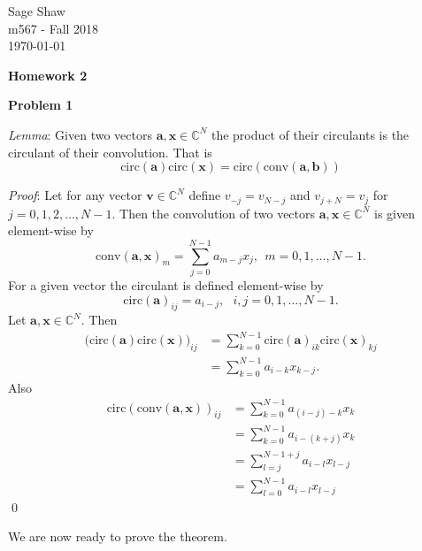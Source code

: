 \documentclass[12pt]{article}
\newcommand{\problem}[1]{\hspace{-4 ex} \large \textbf{Problem #1} }
\renewenvironment{proof}{\hspace{-4 ex} \emph{Proof}:}{\qed}
\newcommand{\CC}{\mathbb{C}}
\renewcommand{\vec}[1]{\boldsymbol{\mathbf{#1}}}
\begin{document}
	\thispagestyle{empty}
	
	\begin{flushright}
		Sage Shaw \\
		m567 - Fall 2018 \\
		\today
	\end{flushright}
	
\begin{center}{\large \textbf{Homework 2}}\end{center}
\bigbreak

\hspace{-.5 ex}\problem{1} 

\textit{Lemma}: Given two vectors $\vec{a}, \vec{x} \in \CC^N$ the product of their circulants is the circulant of their convolution. That is
$$
\text{circ}(\vec{a})\text{circ}(\vec{x}) = \text{circ}(\text{conv}(\vec{a}, \vec{b}))
$$

\begin{proof}
	Let for any vector $\vec{v} \in \CC^N$ define $v_{-j} = v_{N-j}$ and $v_{j+N} = v_j$ for $j=0, 1, 2, \dots, N-1$. Then the convolution of two vectors $\vec{a}, \vec{x} \in \CC^N$ is given element-wise by
	$$
	\text{conv}(\vec{a}, \vec{x})_m = \sum\limits_{j=0}^{N-1} a_{m-j}x_j, \ \ m=0,1,\dots, N-1 \text{.}
	$$
	For a given vector the circulant is defined element-wise by
	$$
	\text{circ}(\vec{a})_{ij} = a_{i-j}, \ \ \ i,j=0,1,\dots, N-1\text{.}
	$$
	Let $\vec{a},\vec{x} \in \CC^N$. Then
	\begin{align*}
		\big( \text{circ}(\vec{a}) \text{circ}(\vec{x}) \big)_{ij} &= \sum\limits_{k=0}^{N-1} \text{circ}(\vec{a})_{ik} \text{circ}(\vec{x})_{kj} \\
		&= \sum\limits_{k=0}^{N-1} a_{i-k} x_{k-j} \text{.}
	\end{align*}
	Also
	\begin{align*}
	\text{circ}(\text{conv}(\vec{a}, \vec{x}))_{ij} &= \sum\limits_{k=0}^{N-1} a_{(i-j)-k}x_k \\
	&= \sum\limits_{k=0}^{N-1} a_{i-(k+j)}x_k \\
	&= \sum\limits_{l=j}^{N-1+j} a_{i-l}x_{l-j} \\
	&= \sum\limits_{l=0}^{N-1} a_{i-l}x_{l-j}
	\end{align*}
\end{proof}

We are now ready to prove the theorem.\bigbreak
\end{document}
